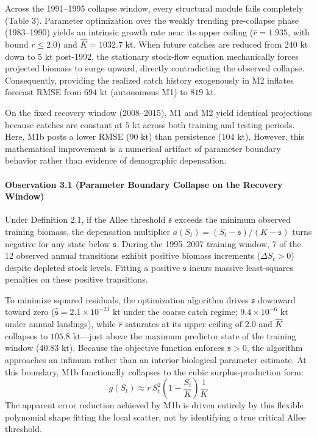 \documentclass[11pt]{article}
\begin{document}
Across the 1991--1995 collapse window, every structural module fails
completely (Table 3). Parameter optimization over the weakly trending
pre-collapse phase (1983--1990) yields an intrinsic growth rate near its
upper ceiling (\(\hat{r} = 1.935\), with bound \(r \le 2.0\)) and
\(\hat{K} = 1032.7\text{ kt}\). When future catches are reduced from
\(240\text{ kt}\) down to \(5\text{ kt}\) post-1992, the stationary
stock-flow equation mechanically forces projected biomass to surge
upward, directly contradicting the observed collapse. Consequently,
providing the realized catch history exogenously in M2 inflates forecast
RMSE from \(694\text{ kt}\) (autonomous M1) to \(819\text{ kt}\).

On the fixed recovery window (2008--2015), M1 and M2 yield identical
projections because catches are constant at \(5\text{ kt}\) across both
training and testing periods. Here, M1b posts a lower RMSE
(\(90\text{ kt}\)) than persistence (\(104\text{ kt}\)). However, this
mathematical improvement is a numerical artifact of parameter boundary
behavior rather than evidence of demographic depensation.

\paragraph{Observation 3.1 (Parameter Boundary Collapse on the Recovery
Window)}\label{observation-3.1-parameter-boundary-collapse-on-the-recovery-window}

Under Definition 2.1, if the Allee threshold \(\mathfrak{s}\) exceeds
the minimum observed training biomass, the depensation multiplier
\(a(S_t) = (S_t - \mathfrak{s}) / (K - \mathfrak{s})\) turns negative
for any state below \(\mathfrak{s}\). During the 1995--2007 training
window, 7 of the 12 observed annual transitions exhibit positive biomass
increments (\(\Delta S_t > 0\)) despite depleted stock levels. Fitting a
positive \(\mathfrak{s}\) incurs massive least-squares penalties on
these positive transitions.

To minimize squared residuals, the optimization algorithm drives
\(\mathfrak{s}\) downward toward zero
(\(\hat{\mathfrak{s}} = 2.1 \times 10^{-23}\text{ kt}\) under the coarse
catch regime; \(9.4 \times 10^{-6}\text{ kt}\) under annual landings),
while \(\hat{r}\) saturates at its upper ceiling of \(2.0\) and
\(\hat{K}\) collapses to \(105.8\text{ kt}\)---just above the maximum
predictor state of the training window (\(40.83\text{ kt}\)). Because
the objective function enforces \(\mathfrak{s} > 0\), the algorithm
approaches an infimum rather than an interior biological parameter
estimate. At this boundary, M1b functionally collapses to the cubic
surplus-production form:
\[g(S_t) \approx r \, S_t^2 \left(1 - \frac{S_t}{K}\right) \frac{1}{K}\]
The apparent error reduction achieved by M1b is driven entirely by this
flexible polynomial shape fitting the local scatter, not by identifying
a true critical Allee threshold.
\end{document}
